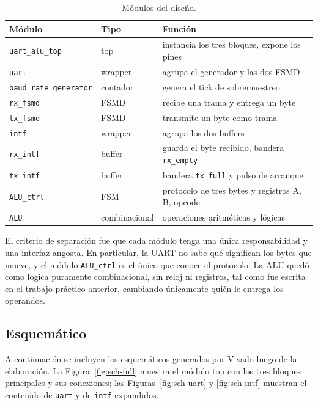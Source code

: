 \documentclass[12pt,a4paper]{article}
\begin{document}
\begin{table}[H]
  \centering
  \small
  \begin{tabular}{@{}lll@{}}
    \toprule
    \textbf{Módulo} & \textbf{Tipo} & \textbf{Función} \\
    \midrule
    \texttt{uart\_alu\_top}        & top       & instancia los tres bloques, expone los pines \\
    \texttt{uart}                  & wrapper   & agrupa el generador y las dos FSMD \\
    \texttt{baud\_rate\_generator} & contador  & genera el tick de sobremuestreo \\
    \texttt{rx\_fsmd}              & FSMD      & recibe una trama y entrega un byte \\
    \texttt{tx\_fsmd}              & FSMD      & transmite un byte como trama \\
    \texttt{intf}                  & wrapper   & agrupa los dos buffers \\
    \texttt{rx\_intf}              & buffer    & guarda el byte recibido, bandera \texttt{rx\_empty} \\
    \texttt{tx\_intf}              & buffer    & bandera \texttt{tx\_full} y pulso de arranque \\
    \texttt{ALU\_ctrl}             & FSM       & protocolo de tres bytes y registros A, B, opcode \\
    \texttt{ALU}                   & combinacional & operaciones aritméticas y lógicas \\
    \bottomrule
  \end{tabular}
  \caption{Módulos del diseño.}
\end{table}

El criterio de separación fue que cada módulo tenga una única responsabilidad y
una interfaz angosta. En particular, la UART no sabe qué significan los bytes
que mueve, y el módulo \texttt{ALU\_ctrl} es el único que conoce el protocolo.
La ALU quedó como lógica puramente combinacional, sin reloj ni registros, tal
como fue escrita en el trabajo práctico anterior, cambiando únicamente quién le
entrega los operandos.

\subsection{Esquemático}

A continuación se incluyen los esquemáticos generados por Vivado luego de la
elaboración. La Figura~\ref{fig:sch-full} muestra el módulo top con los tres
bloques principales y sus conexiones; las Figuras~\ref{fig:sch-uart} y
\ref{fig:sch-intf} muestran el contenido de \texttt{uart} y de \texttt{intf}
expandidos.
\end{document}
